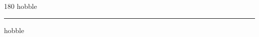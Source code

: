 
\begin{frame}
\begin{center}
\begin{turn}{180}
{\fontsize{2.5cm}{1em}\selectfont hobble}
\end{turn}
\vspace{1em}\par  
\hrule
\vspace{1em}\par  
{\fontsize{2.5cm}{1em}\selectfont hobble}
\end{center}
\end{frame}
